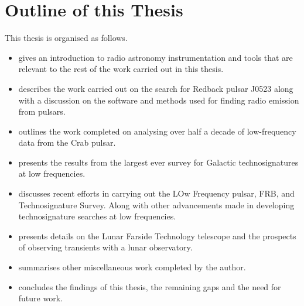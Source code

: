 \newpage
\section{Outline of this Thesis}

This thesis is organised as follows.

\begin{itemize}[label={}]
  \item {} gives an introduction to radio astronomy instrumentation and tools that are relevant to the rest of the work carried out in this thesis. 
  \item {} describes the work carried out on the search for Redback pulsar J0523 along with a discussion on the software and methods used for finding radio emission from pulsars. 
  \item {} outlines the work completed on analysing over half a decade of low-frequency data from the Crab pulsar.
  \item {} presents the results from the largest ever survey for Galactic technosignatures at low frequencies. 
  \item {} discusses recent efforts in carrying out the LOw Frequency pulsar, FRB, and Technosignature Survey. Along with other advancements made in developing technosignature searches at low frequencies. 
  \item {} presents details on the Lunar Farside Technology telescope and the prospects of observing transients with a lunar observatory. 
  \item {} summarises other miscellaneous work completed by the author.
  \item {} concludes the findings of this thesis, the remaining gaps and the need for future work. 
\end{itemize}

